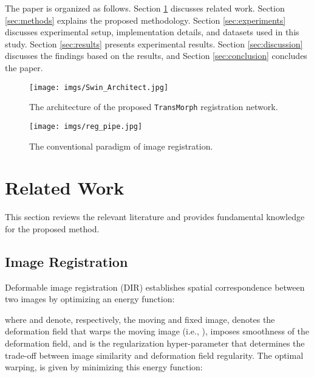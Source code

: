 \documentclass[times,twocolumn,final]{elsarticle}
\begin{document}
The paper is organized as follows. Section \ref{sec:rel_work} discusses related work. Section \ref{sec:methods} explains the proposed methodology. Section \ref{sec:experiments} discusses experimental setup, implementation details, and datasets used in this study. Section \ref{sec:results} presents experimental results. Section \ref{sec:discussion} discusses the findings based on the results, and Section \ref{sec:conclusion} concludes the paper. \begin{figure*}[!t]
\centering
\texttt{[image: imgs/Swin\_Architect.jpg]}
\caption{The architecture of the proposed \texttt{TransMorph} registration network.\label{fig:net_arch}}
\end{figure*}

\begin{figure}[!h]
\centering
\texttt{[image: imgs/reg\_pipe.jpg]}
\caption{The conventional paradigm of image registration.\label{fig:reg_pipe}}
\end{figure}

\section{Related Work}
\label{sec:rel_work}
This section reviews the relevant literature and provides fundamental knowledge for the proposed method.

\subsection{Image Registration}
Deformable image registration (DIR) establishes spatial correspondence between two images by optimizing an energy function:
\begin{linenomath}

\end{linenomath}
where  and  denote, respectively, the moving and fixed image,  denotes the deformation field that warps the moving image (i.e., ),  imposes smoothness of the deformation field, and  is the regularization hyper-parameter that determines the trade-off between image similarity and deformation field regularity. The optimal warping,  is given by minimizing this energy function:
\begin{linenomath}

\end{linenomath}
\end{document}
